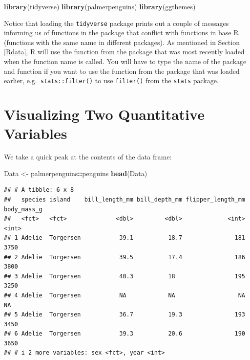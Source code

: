 \documentclass[
]{book}
\newenvironment{Shaded}{\begin{snugshade}}{\end{snugshade}}
\newcommand{\FunctionTok}[1]{\textcolor[rgb]{0.13,0.29,0.53}{\textbf{#1}}}
\newcommand{\NormalTok}[1]{#1}
\newcommand{\OtherTok}[1]{\textcolor[rgb]{0.56,0.35,0.01}{#1}}
\newcommand{\SpecialCharTok}[1]{\textcolor[rgb]{0.81,0.36,0.00}{\textbf{#1}}}
\theoremstyle{definition}
\theoremstyle{definition}
\theoremstyle{definition}
\theoremstyle{definition}
\theoremstyle{remark}
\begin{document}
\begin{Shaded}
\begin{Highlighting}[]
\FunctionTok{library}\NormalTok{(tidyverse)}
\FunctionTok{library}\NormalTok{(palmerpenguins)}
\FunctionTok{library}\NormalTok{(ggthemes)}
\end{Highlighting}
\end{Shaded}

Notice that loading the \texttt{tidyverse} package prints out a couple of messages informing us of functions in the package that conflict with functions in base R (functions with the same name in different packages). As mentioned in Section \ref{Rdata}, R will use the function from the package that was most recently loaded when the function name is called. You will have to type the name of the package and function if you want to use the function from the package that was loaded earlier, e.g.~\texttt{stats::filter()} to use \texttt{filter()} from the \texttt{stats} package.

\hypertarget{visualizing-two-quantitative-variables}{%
\section{Visualizing Two Quantitative Variables}\label{visualizing-two-quantitative-variables}}

We take a quick peak at the contents of the data frame:

\begin{Shaded}
\begin{Highlighting}[]
\NormalTok{Data }\OtherTok{\textless{}{-}}\NormalTok{ palmerpenguins}\SpecialCharTok{::}\NormalTok{penguins}
\FunctionTok{head}\NormalTok{(Data)}
\end{Highlighting}
\end{Shaded}

\begin{verbatim}
## # A tibble: 6 x 8
##   species island    bill_length_mm bill_depth_mm flipper_length_mm body_mass_g
##   <fct>   <fct>              <dbl>         <dbl>             <int>       <int>
## 1 Adelie  Torgersen           39.1          18.7               181        3750
## 2 Adelie  Torgersen           39.5          17.4               186        3800
## 3 Adelie  Torgersen           40.3          18                 195        3250
## 4 Adelie  Torgersen           NA            NA                  NA          NA
## 5 Adelie  Torgersen           36.7          19.3               193        3450
## 6 Adelie  Torgersen           39.3          20.6               190        3650
## # i 2 more variables: sex <fct>, year <int>
\end{verbatim}
\end{document}
